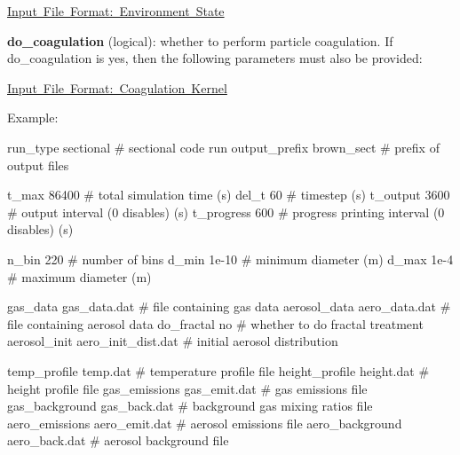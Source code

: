 \begin{DoxyItemize}
\item \mbox{\hyperlink{input_format_env_state}{Input File Format\+: Environment State}}
\item {\bfseries do\+\_\+coagulation} (logical)\+: whether to perform particle coagulation. If {\ttfamily do\+\_\+coagulation} is {\ttfamily yes}, then the following parameters must also be provided\+:
\begin{DoxyItemize}
\item \mbox{\hyperlink{input_format_coag_kernel}{Input File Format\+: Coagulation Kernel}}
\end{DoxyItemize}
\end{DoxyItemize}

Example\+: 
\begin{DoxyPre}
 run\_type sectional              \# sectional code run
 output\_prefix brown\_sect        \# prefix of output files\end{DoxyPre}



\begin{DoxyPre} t\_max 86400                     \# total simulation time (s)
 del\_t 60                        \# timestep (s)
 t\_output 3600                   \# output interval (0 disables) (s)
 t\_progress 600                  \# progress printing interval (0 disables) (s)\end{DoxyPre}



\begin{DoxyPre} n\_bin 220                       \# number of bins
 d\_min 1e-10                     \# minimum diameter (m)
 d\_max 1e-4                      \# maximum diameter (m)\end{DoxyPre}



\begin{DoxyPre} gas\_data gas\_data.dat           \# file containing gas data
 aerosol\_data aero\_data.dat      \# file containing aerosol data
 do\_fractal no                   \# whether to do fractal treatment
 aerosol\_init aero\_init\_dist.dat \# initial aerosol distribution\end{DoxyPre}



\begin{DoxyPre} temp\_profile temp.dat           \# temperature profile file
 height\_profile height.dat       \# height profile file
 gas\_emissions gas\_emit.dat      \# gas emissions file
 gas\_background gas\_back.dat     \# background gas mixing ratios file
 aero\_emissions aero\_emit.dat    \# aerosol emissions file
 aero\_background aero\_back.dat   \# aerosol background file\end{DoxyPre}



